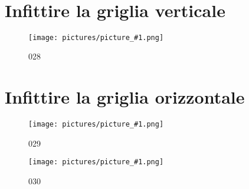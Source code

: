 \documentclass[17pt]{extarticle}
\newcommand{\pict}[1]{
\begin{figure}[h!]		
	\centering
   	\texttt{[image: pictures/picture\_\#1.png]}
  	\caption{#1}
   	\label{fig:LibreOfficeCalc#1}
\end{figure}
}
\begin{document}
\newpage
~\newpage

\section{Infittire la griglia verticale}



%
\pict{028}

\section{Infittire la griglia orizzontale}

%
\pict{029}


%
\pict{030}
\end{document}
